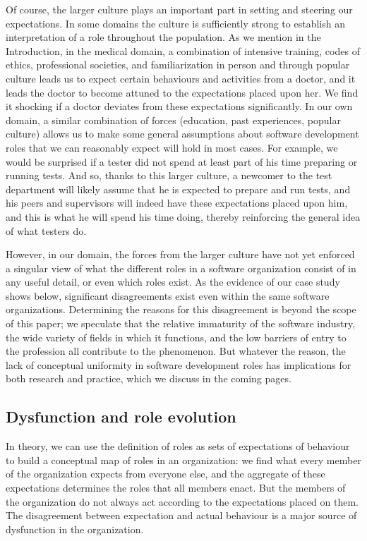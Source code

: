 \documentclass[10pt, conference, compsocconf]{IEEEtran}
\begin{document}
Of course, the larger culture plays an important part in setting and steering our expectations. In some domains the culture is sufficiently strong to establish an interpretation of a role throughout the population. As we mention in the Introduction, in the medical domain, a combination of intensive training, codes of ethics, professional societies, and familiarization in person and through popular culture leads us to expect certain behaviours and activities from a doctor, and it leads the doctor to become attuned to the expectations placed upon her. We find it shocking if a doctor deviates from these expectations significantly. In our own domain, a similar combination of forces (education, past experiences, popular culture) allows us to make some general assumptions about software development roles that we can reasonably expect will hold in most cases. For example, we would be surprised if a tester did not spend at least part of his time preparing or running tests. And so, thanks to this larger culture, a newcomer to the test department will likely assume that he is expected to prepare and run tests, and his peers and supervisors will indeed have these expectations placed upon him, and this is what he will spend his time doing, thereby reinforcing the general idea of what testers do.

However, in our domain, the forces from the larger culture have not yet enforced a singular view of what the different roles in a software organization consist of in any useful detail, or even which roles exist. As the evidence of our case study shows below, significant disagreements exist even within the same software organizations. Determining the reasons for this disagreement is beyond the scope of this paper; we speculate that the relative immaturity of the software industry, the wide variety of fields in which it functions, and the low barriers of entry to the profession all contribute to the phenomenon. But whatever the reason, the lack of conceptual uniformity in software development roles has implications for both research and practice, which we discuss in the coming pages.


\subsection{Dysfunction and role evolution}

In theory, we can use the definition of roles as sets of expectations of behaviour to build a conceptual map of roles in an organization: we find what every member of the organization expects from everyone else, and the aggregate of these expectations determines the roles that all members enact. But the members of the organization do not always act according to the expectations placed on them. The disagreement between expectation and actual behaviour is a major source of dysfunction in the organization.
\end{document}
